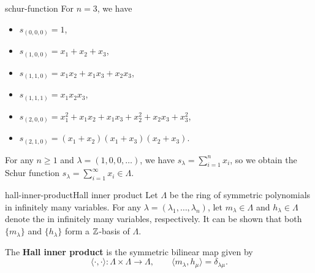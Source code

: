 \begin{example}{schur-function}
    For $n = 3$, we have
    \begin{itemize}
        \item $s_{(0, 0, 0)} = 1$,
        \item $s_{(1, 0, 0)} = x_1 + x_2 + x_3$,
        \item $s_{(1, 1, 0)} = x_1 x_2 + x_1 x_3 + x_2 x_3$,
        \item $s_{(1, 1, 1)} = x_1 x_2 x_3$,
        \item $s_{(2, 0, 0)} = x_1^2 + x_1 x_2 + x_1 x_3 + x_2^2 + x_2 x_3 + x_3^2$,
        \item $s_{(2, 1, 0)} = (x_1 + x_2) (x_1 + x_3) (x_2 + x_3)$.
    \end{itemize}
    For any $n \ge 1$ and $\lambda = (1, 0, 0, \ldots)$, we have $s_\lambda = \sum_{i = 1}^{n} x_i$, so we obtain the Schur function $s_\lambda = \sum_{i = 1}^{\infty} x_i \in \Lambda$.
\end{example}

    

\begin{topic}{hall-inner-product}{Hall inner product}
    Let $\Lambda$ be the ring of symmetric polynomials in infinitely many variables. For any  $\lambda = (\lambda_1, \ldots, \lambda_n)$, let $m_\lambda \in \Lambda$ and $h_\lambda \in \Lambda$ denote the  in infinitely many variables, respectively. It can be shown that both $\{ m_\lambda \}$ and $\{ h_\lambda \}$ form a $\mathbb{Z}$-basis of $\Lambda$.
    
    The \textbf{Hall inner product} is the symmetric bilinear map given by
    \[ \langle \cdot, \cdot \rangle : \Lambda \times \Lambda \to \Lambda, \qquad \langle m_\lambda, h_\mu \rangle = \delta_{\lambda \mu} . \]
\end{topic}

